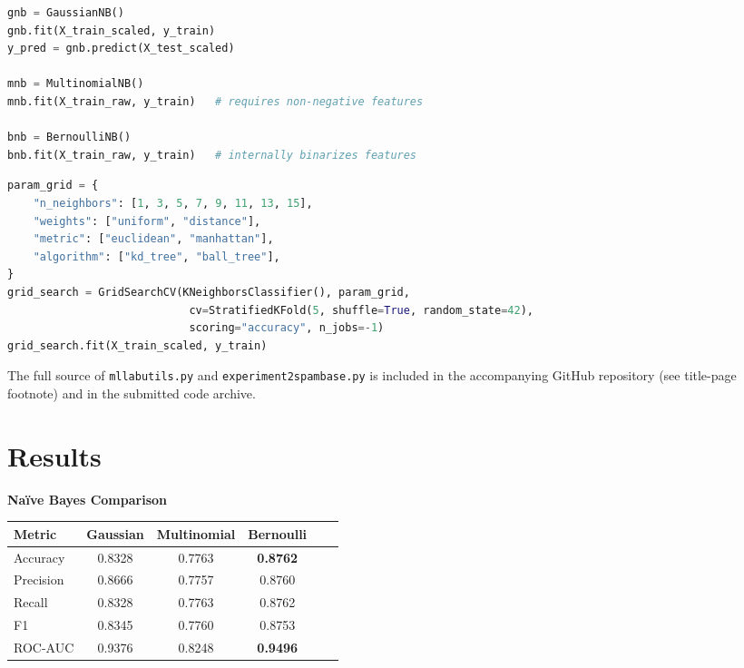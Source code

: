 \documentclass[12pt,a4paper]{article}
\newenvironment{fitwidth}
  {\begin{lrbox}{\fitbox}}
  {\end{lrbox}\ifdim\wd\fitbox>\linewidth\resizebox{\linewidth}{!}{\usebox{\fitbox}}\else\usebox{\fitbox}\fi}
\DeclareRobustCommand{\_}{\textunderscore\allowbreak}
\begin{document}
\begin{lstlisting}[language=Python, caption={Naive Bayes variants -- driver excerpt from \texttt{experiment2\_spambase.py}.}]
gnb = GaussianNB()
gnb.fit(X_train_scaled, y_train)
y_pred = gnb.predict(X_test_scaled)

mnb = MultinomialNB()
mnb.fit(X_train_raw, y_train)   # requires non-negative features

bnb = BernoulliNB()
bnb.fit(X_train_raw, y_train)   # internally binarizes features
\end{lstlisting}

\begin{lstlisting}[language=Python, caption={KNN hyperparameter tuning excerpt.}]
param_grid = {
    "n_neighbors": [1, 3, 5, 7, 9, 11, 13, 15],
    "weights": ["uniform", "distance"],
    "metric": ["euclidean", "manhattan"],
    "algorithm": ["kd_tree", "ball_tree"],
}
grid_search = GridSearchCV(KNeighborsClassifier(), param_grid,
                            cv=StratifiedKFold(5, shuffle=True, random_state=42),
                            scoring="accuracy", n_jobs=-1)
grid_search.fit(X_train_scaled, y_train)
\end{lstlisting}

The full source of \texttt{ml\_lab\_utils.py} and
\texttt{experiment2\_spambase.py} is included in the accompanying GitHub
repository (see title-page footnote) and in the submitted code archive.

\section{Results}

\begin{center}
\begin{minipage}{\linewidth}\centering
\textbf{Na\"ive Bayes Comparison}\par\smallskip
\begin{fitwidth}
\begin{tabular}{lccccc}
\toprule
Metric & Gaussian & Multinomial & Bernoulli \\
\midrule
Accuracy  & 0.8328 & 0.7763 & \textbf{0.8762} \\
Precision & 0.8666 & 0.7757 & 0.8760 \\
Recall    & 0.8328 & 0.7763 & 0.8762 \\
F1        & 0.8345 & 0.7760 & 0.8753 \\
ROC-AUC   & 0.9376 & 0.8248 & \textbf{0.9496} \\
\bottomrule
\end{tabular}
\end{fitwidth}
\end{minipage}
\end{center}
\end{document}
